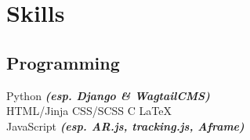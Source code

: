 \documentclass[a4paper]{deedy-resume} %
\begin{document}
\begin{minipage}[t]{0.33\textwidth}



\sectionspace
\section{Skills}

\subsection{Programming}

\sectionspace

Python {\footnotesize \textit{\textbf{(esp. Django \& WagtailCMS)}}} \\
HTML/Jinja \textbullet{} CSS/SCSS \textbullet{} C \textbullet{} \LaTeX\  \textbullet{}\\
JavaScript {\footnotesize \textit{\textbf{(esp. AR.js, tracking.js, Aframe)}}} \\


\end{minipage}
\end{document}
